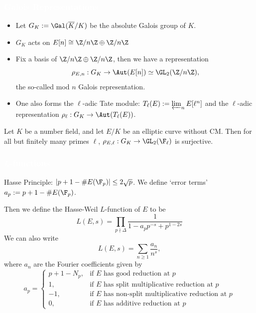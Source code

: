 \begin{frame}[plain]
\frametitle{\textcolor{white}{Galois Representations}}

\begin{itemize}
\item Let $G_K:= \Gal(\overline{K}/K)$ be the absolute Galois group of $K$. 

\item $G_K$ acts on $E[n] \cong \Z/n\Z \oplus \Z/n\Z$

\item Fix a basis of $\Z/n\Z \oplus \Z/n\Z$, then we have a representation
	\[
	\rho_{E,n}: G_K \to \Aut(E[n]) \simeq \GL_2(\Z/n\Z),
	\]
the so-called mod $n$ Galois representation. 

\item One also forms the $\ell$-adic Tate module: $T_\ell(E):= \varprojlim_n E[\ell^n]$ and the $\ell$-adic representation $\rho_\ell: G_K \to \Aut(T_\ell(E))$. 
\end{itemize}

\begin{thm}[Serre]
Let $K$ be a number field, and let $E/K$ be an elliptic curve without CM. Then for all but finitely many primes $\ell$, $\rho_{E,\ell}: G_K \to \GL_2(\F_\ell)$ is surjective. 
\end{thm}
\end{frame}



\begin{frame}[plain]
\frametitle{\textcolor{white}{$L$-functions}}

Hasse Principle: $|p+1- \#E(\F_p)| \leq 2 \sqrt{p}$. We define `error terms' $a_p:= p + 1 - \#E(\F_p)$. \pause \par \vspace{0.5cm}

Then we define the Hasse-Weil $L$-function of $E$ to be
	\[
	L(E,s)= \prod_{p \nmid \Delta} \dfrac{1}{1 - a_p p^{-s} + p^{1-2s}}
	\] \pause
We can also write
	\[
	L(E,s)= \sum_{n \geq 1} \dfrac{a_n}{n^s},
	\]
where $a_n$ are the Fourier coefficients given by
	\[
	a_p=
	\begin{cases}
	p+1-N_p, & \text{if } E \text{ has good reduction at } p \\
	1, & \text{if } E \text{ has split multiplicative reduction at } p \\
	-1, & \text{if } E \text{ has non-split multiplicative reduction at } p \\
	0, & \text{if } E \text{ has additive reduction at } p
	\end{cases}
	\]
\end{frame}



